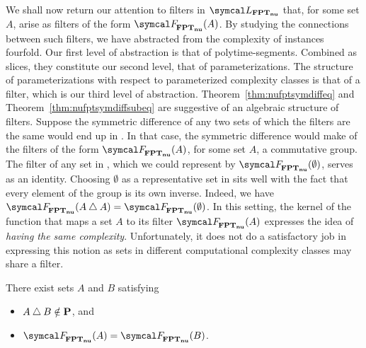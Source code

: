 We shall now return our attention to filters in $\calL_\clnu{FPT}$ that, for some set $A$, arise as filters of the form $\calF_\clnu{FPT}(A)$.
By studying the connections between such filters, we have abstracted from the complexity of instances fourfold.
Our first level of abstraction is that of polytime-segments.
Combined as slices, they constitute our second level, that of parameterizations.
The structure of parameterizations with respect to parameterized complexity classes is that of a filter, which is our third level of abstraction.
Theorem~\ref{thm:nufptsymdiffeq} and Theorem~\ref{thm:nufptsymdiffsubeq} are suggestive of an algebraic structure of filters.
Suppose the symmetric difference of any two sets of which the filters are the same would end up in .
In that case, the symmetric difference would make of the filters of the form $\calF_\clnu{FPT}(A)$, for some set $A$, a commutative group.
The filter of any set in , which we could represent by $\calF_\clnu{FPT}(\emptyset)$, serves as an identity.
Choosing $\emptyset$ as a representative set in  sits well with the fact that every element of the group is its own inverse.
Indeed, we have $\calF_\clnu{FPT}(A \symdiff A) = \calF_\clnu{FPT}(\emptyset)$.
In this setting, the kernel of the function that maps a set $A$ to its filter $\calF_\clnu{FPT}(A)$ expresses the idea of \emph{having the same complexity}.
Unfortunately, it does not do a satisfactory job in expressing this notion as sets in different computational complexity classes may share a filter.
\begin{theorem}
\label{thm:nufptsymdiff}%
  There exist sets $A$ and $B$ satisfying
  \begin{itemize}
  \item $A \bigtriangleup B \notin \textnormal{\textbf{P}}$, and
  \item $\calF_\clnu{FPT}(A) = \calF_\clnu{FPT}(B)$.
  \end{itemize}
\end{theorem}

